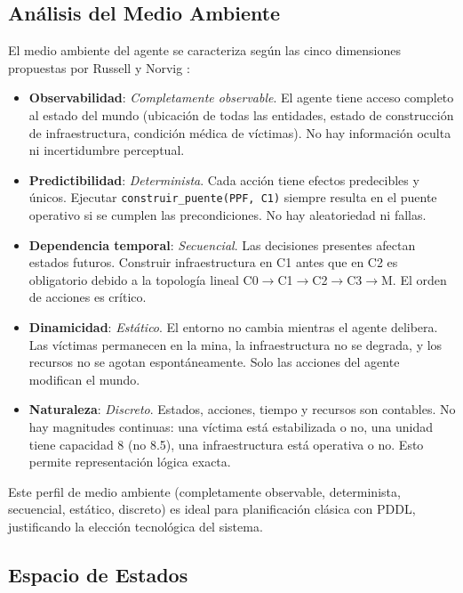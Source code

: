 \documentclass[conference]{IEEEtran}
\begin{document}
    \subsection{Análisis del Medio Ambiente}

    El medio ambiente del agente se caracteriza según las cinco dimensiones propuestas por Russell y Norvig \cite{russell2020aima}:

    \begin{itemize}[leftmargin=*,itemsep=3pt]
    \item \textbf{Observabilidad}: \textit{Completamente observable}. El agente tiene acceso completo al estado del mundo (ubicación de todas las entidades, estado de construcción de infraestructura, condición médica de víctimas). No hay información oculta ni incertidumbre perceptual.

    \item \textbf{Predictibilidad}: \textit{Determinista}. Cada acción tiene efectos predecibles y únicos. Ejecutar \texttt{construir\_puente(PPF, C1)} siempre resulta en el puente operativo si se cumplen las precondiciones. No hay aleatoriedad ni fallas.

    \item \textbf{Dependencia temporal}: \textit{Secuencial}. Las decisiones presentes afectan estados futuros. Construir infraestructura en C1 antes que en C2 es obligatorio debido a la topología lineal C0$\to$C1$\to$C2$\to$C3$\to$M. El orden de acciones es crítico.

    \item \textbf{Dinamicidad}: \textit{Estático}. El entorno no cambia mientras el agente delibera. Las víctimas permanecen en la mina, la infraestructura no se degrada, y los recursos no se agotan espontáneamente. Solo las acciones del agente modifican el mundo.

    \item \textbf{Naturaleza}: \textit{Discreto}. Estados, acciones, tiempo y recursos son contables. No hay magnitudes continuas: una víctima está estabilizada o no, una unidad tiene capacidad 8 (no 8.5), una infraestructura está operativa o no. Esto permite representación lógica exacta.
    \end{itemize}

    Este perfil de medio ambiente (completamente observable, determinista, secuencial, estático, discreto) es ideal para planificación clásica con PDDL, justificando la elección tecnológica del sistema.

    \subsection{Espacio de Estados}
\end{document}
